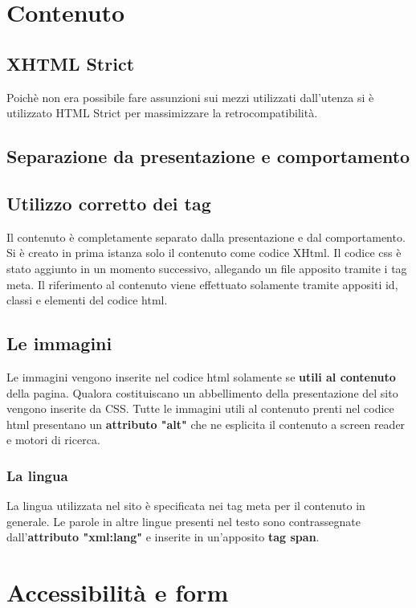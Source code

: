 \documentclass[12pt,a4paper]{article}
\begin{document}
\section{Contenuto}
\subsection{XHTML Strict}
Poichè non era possibile fare assunzioni sui mezzi utilizzati dall'utenza si è utilizzato HTML Strict per massimizzare la retrocompatibilità. 
\subsection{Separazione da presentazione e comportamento}
\subsection{Utilizzo corretto dei tag}
Il contenuto è completamente separato dalla presentazione e dal comportamento. 
Si è creato in prima istanza solo il contenuto come codice XHtml. Il codice css è stato aggiunto in un momento successivo, allegando un file apposito tramite i tag meta. 
Il riferimento al contenuto viene effettuato solamente tramite appositi id, classi e elementi del codice html. 
 
\subsection{Le immagini}
Le immagini vengono inserite nel codice html solamente se \textbf{utili al contenuto} della pagina. 
Qualora costituiscano un abbellimento della presentazione del sito vengono inserite da CSS. 
Tutte le immagini utili al contenuto prenti nel codice html presentano un \textbf{attributo "alt"} che ne esplicita il contenuto a screen reader e motori di ricerca. 

\subsubsection{La lingua} La lingua utilizzata nel sito è specificata nei tag meta per il contenuto in generale. 
Le parole in altre lingue presenti nel testo sono contrassegnate dall'\textbf{attributo "xml:lang"}  e inserite in un'apposito \textbf{tag span}.

\section{Accessibilità e form}
\end{document}
